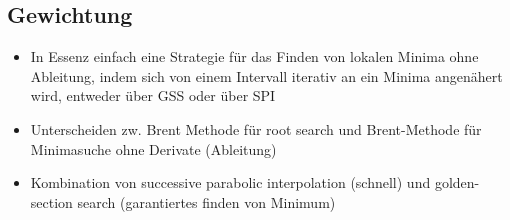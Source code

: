 \subsection{Gewichtung}
\begin{itemize}
	\item In Essenz einfach eine Strategie für das Finden von lokalen Minima ohne Ableitung, indem sich von einem Intervall iterativ an ein Minima angenähert wird, entweder über GSS oder über SPI %
	\item Unterscheiden zw. Brent Methode für root search und Brent-Methode für Minimasuche ohne Derivate (Ableitung)
	\item Kombination von successive parabolic interpolation (schnell) und golden-section search (garantiertes finden von Minimum) %
\end{itemize}


